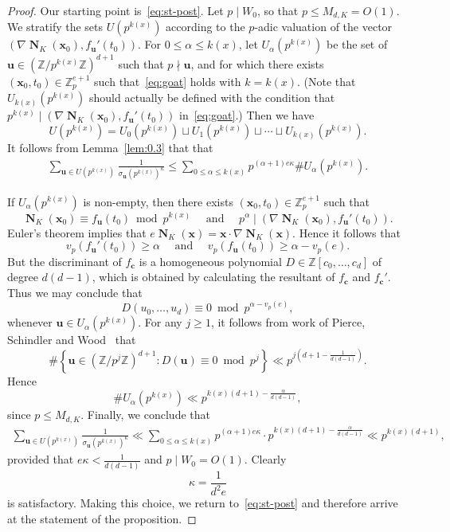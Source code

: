 \documentclass[11pt,letterpaper]{amsart}
\renewcommand{\leq}{\leqslant}
\renewcommand{\geq}{\geqslant}
\theoremstyle{definition}
\numberwithin{equation}{section}
\newcommand\ZZ{\mathbb{Z}}
\newcommand{\x}{\mathbf{x}}
\renewcommand{\c}{\mathbf{c}}
\renewcommand{\u}{\mathbf{u}}
\DeclareMathOperator{\nf}{\mathbf{N}}
\newcommand{\0}{\mathbf{0}}
\begin{document}
\begin{proof}
Our 
starting point is~\eqref{eq:st-post}. 
Let $p\mid W_0$, so that $p\leq M_{d,K}=O(1)$.
We stratify the sets 
$U(p^{k(x)})$ according to the $p$-adic valuation of the vector 
$ (\nabla \nf_K(\x_0), f_\u'(t_0))$. 
For $0\leq \alpha\leq k(x)$, let $U_\alpha(p^{k(x)})$ be the set of $\u\in (\ZZ/p^{k(x)}\ZZ)^{d+1}$ such that  $p\nmid \u$, and for which there exists
$ (\x_0,t_0)\in \ZZ_p^{e+1}$ such that~\eqref{eq:goat} holds with $k=k(x)$.
(Note that $U_{k(x)}(p^{k(x)})$ should actually be defined with the condition that 
$p^{k(x)}\mid  (\nabla \nf_K(\x_0), f_\u'(t_0))$ in~\eqref{eq:goat}.)
Then we have  
$$
U(p^{k(x)})=U_0(p^{k(x)})\sqcup U_1(p^{k(x)})\sqcup \cdots 
\sqcup
U_{{k(x)}}(p^{k(x)}).
$$
It follows from Lemma~\ref{lem:0.3} that  
that 
\begin{align*}
\sum_{\u\in U(p^{k(x)})} \frac{1}{\sigma_\u(p^{k(x)})^\kappa}
\leq \sum_{0\leq \alpha\leq {k(x)}} 
p^{(\alpha+1)e\kappa}\#U_\alpha(p^{k(x)}).
\end{align*}


If $U_\alpha(p^{k(x)})$ is non-empty, then there exists 
$ (\x_0,t_0)\in \ZZ_p^{e+1}$ such that
$$
\nf_K(\x_0)\equiv f_\u(t_0) \bmod{p^{k(x)}}\quad \text{ and }\quad
p^\alpha\mid  (\nabla \nf_K(\x_0), f_\u'(t_0)).
$$
Euler's theorem implies that 
$e\nf_K(\x)=\x\cdot\nabla \nf_K(\x)$. Hence it follows that 
$$
v_p(f_\u'(t_0))\geq \alpha \quad \text{ and } \quad 
v_p(f_\u(t_0))\geq \alpha-v_p(e).
$$
But the discriminant of $f_\c$ is a homogeneous polynomial
$D\in \ZZ[c_0,\dots,c_d]$ 
of degree $d(d-1)$, which is  obtained by calculating the resultant of $f_\c$ and $f_\c'$. Thus we may conclude that 
$$
D(u_0,\dots,u_d)\equiv 0 \bmod{p^{\alpha-v_p(e)}},
$$
whenever $\u\in U_\alpha(p^{k(x)})$.
For any $j\geq 1$, it follows from work of Pierce, Schindler and Wood~\cite[Lemma~4.10]{wood} that 
$$
\#\left\{\u\in (\ZZ/p^j\ZZ)^{d+1}: D(\u)\equiv 0\bmod{p^j}\right\}\ll 	p^{j(d+1-\frac{1}{d(d-1)})}.
$$
Hence
$$
\#U_\alpha (p^{k(x)})\ll  p^{{k(x)}(d+1)-\frac{\alpha}{d(d-1)}},
$$
since $p\leq M_{d,K}$.
Finally, we conclude 
that 
\begin{align*}
\sum_{\u\in U(p^{k(x)})} \frac{1}{\sigma_\u(p^{k(x)})^\kappa}
\ll \sum_{0\leq \alpha\leq {k(x)}} 
p^{(\alpha+1)e\kappa}\cdot p^{{k(x)}(d+1)-\frac{\alpha}{d(d-1)}}\ll p^{{k(x)}(d+1)},
\end{align*}
provided that $e\kappa<\frac{1}{d(d-1)}$ and $p\mid W_0=O(1)$.
Clearly 
$$
\kappa=\frac{1}{d^2e}
$$
is  satisfactory. 
Making this choice, we 
return  to~\eqref{eq:st-post} and therefore arrive  at the statement of the  proposition.
\end{proof}
\end{document}
